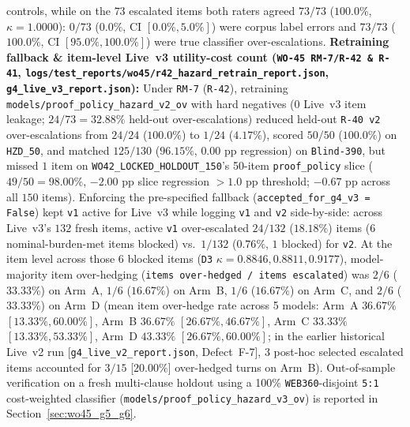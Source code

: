 \documentclass[11pt,a4paper]{article}
\begin{document}
\begin{itemize}
controls, while on the $73$ escalated items both raters agreed $73/73$ ($100.0\%$, $\kappa = 1.0000$): $0/73$ ($0.0\%$, CI $[0.0\%, 5.0\%]$) were corpus label errors and $73/73$ ($100.0\%$, CI $[95.0\%, 100.0\%]$) were true classifier over-escalations. \textbf{Retraining fallback \& item-level Live~v3 utility-cost count (\texttt{WO-45 RM-7/R-42 \& R-41}, \texttt{logs/test\_reports/wo45/r42\_hazard\_retrain\_report.json}, \texttt{g4\_live\_v3\_report.json}):} Under \texttt{RM-7} (\texttt{R-42}), retraining \texttt{models/proof\_policy\_hazard\_v2\_ov} with hard negatives ($0$ Live~v3 item leakage; $24/73 = 32.88\%$ held-out over-escalations) reduced held-out \texttt{R-40 v2} over-escalations from $24/24$ ($100.0\%$) to $1/24$ ($4.17\%$), scored $50/50$ ($100.0\%$) on \texttt{HZD\_50}, and matched $125/130$ ($96.15\%$, $0.00\text{ pp}$ regression) on \texttt{Blind-390}, but missed $1$ item on \texttt{WO42\_LOCKED\_HOLDOUT\_150}'s 50-item \texttt{proof\_policy} slice ($49/50 = 98.00\%$, $-2.00\text{ pp}$ slice regression $> 1.0\text{ pp}$ threshold; $-0.67\text{ pp}$ across all $150$ items). Enforcing the pre-specified fallback (\texttt{accepted\_for\_g4\_v3 = False}) kept \texttt{v1} active for Live~v3 while logging \texttt{v1} and \texttt{v2} side-by-side: across Live~v3's $132$ fresh items, active \texttt{v1} over-escalated $24/132$ ($18.18\%$) items ($6$ nominal-burden-met items blocked) vs.\ $1/132$ ($0.76\%$, $1$ blocked) for \texttt{v2}. At the item level across those $6$ blocked items (\texttt{D3} $\kappa = 0.8846, 0.8811, 0.9177$), model-majority item over-hedging (\texttt{items over-hedged / items escalated}) was $2/6$ ($33.33\%$) on Arm~A, $1/6$ ($16.67\%$) on Arm~B, $1/6$ ($16.67\%$) on Arm~C, and $2/6$ ($33.33\%$) on Arm~D (mean item over-hedge rate across 5 models: Arm~A $36.67\%$ $[13.33\%, 60.00\%]$, Arm~B $36.67\%$ $[26.67\%, 46.67\%]$, Arm~C $33.33\%$ $[13.33\%, 53.33\%]$, Arm~D $43.33\%$ $[26.67\%, 60.00\%]$; in the earlier historical Live~v2 run [\texttt{g4\_live\_v2\_report.json}, Defect~F-7], $3$ post-hoc selected escalated items accounted for $3/15$ [$20.00\%$] over-hedged turns on Arm~B). Out-of-sample verification on a fresh multi-clause holdout using a 100\% \texttt{WEB360}-disjoint \texttt{5:1} cost-weighted classifier (\texttt{models/proof\_policy\_hazard\_v3\_ov}) is reported in Section~\ref{sec:wo45_g5_g6}.
\end{itemize}
\end{document}
